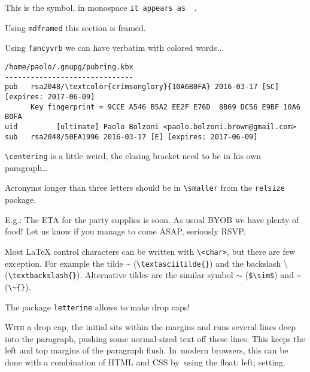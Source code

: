 \documentclass[a4paper]{article}
\newcommand\ifmonospace{\ifdim\fontdimen3\font=0pt }
\newcommand\Cpp{%
\ifmonospace%
    C++%
\else%
    C\kern-.1667em\raise.30ex\hbox{\smaller{++}}%
\fi%
\spacefactor1000 }
\begin{document}
This is the \Cpp{} symbol, in monospace \texttt{it appears as \Cpp{}}.

\vskip5mm
\begin{mdframed}[hidealllines=true,backgroundcolor=black!10]
Using \texttt{mdframed} this section is framed.

\blindtext
\end{mdframed}

\vskip5mm
Using \texttt{fancyvrb} we can have verbatim with colored words...
\begin{Verbatim}[commandchars=\\\{\}]
% gpg --fingerprint
/home/paolo/.gnupg/pubring.kbx
------------------------------
pub   rsa2048/\textcolor{crimsonglory}{10A6B0FA} 2016-03-17 [SC] [expires: 2017-06-09]
      Key fingerprint = 9CCE A546 B5A2 EE2F E76D  8B69 DC56 E9BF 10A6 B0FA
uid         [ultimate] Paolo Bolzoni <paolo.bolzoni.brown@gmail.com>
sub   rsa2048/50EA1996 2016-03-17 [E] [expires: 2017-06-09]
\end{Verbatim}

\vskip5mm
\texttt{\textbackslash{}centering} is a little weird, the closing bracket need to be
in his own paragraph\ldots

{\centering
\blindtext

}

\vskip5mm
Acronyms longer than three letters should be in \texttt{\textbackslash{}smaller} from the
\texttt{relsize} package.

E.g.: The ETA for the party supplies is soon. As usual {\smaller BYOB} we have
plenty of food!  Let us know if you manage to come {\smaller ASAP}, seriously
{\smaller RSVP}.

\vskip5mm
Most \LaTeX{} control characters can be written with
\texttt{\textbackslash{}<char>}, but there are few exception. For example the
tilde \textasciitilde{} (\texttt{\textbackslash{}textasciitilde\{\}}) and the
backslash \textbackslash{} (\texttt{\textbackslash{}textbackslash\{\}}).
Alternative tildes are the similar symbol $\sim$
(\texttt{\$\textbackslash{}sim\$}) and \~{}
(\texttt{\textbackslash{}\textasciitilde{}\{\}}).

\vskip5mm
The package \texttt{letterine} allows to make drop caps!

\lettrine[lines=3,slope=-4pt,nindent=-4pt,findent=2pt]{W}{ith} a drop cap, the initial sits
within the margins and runs several lines deep into the paragraph, pushing some
normal-sized text off these lines. This keeps the left and top margins of the
paragraph flush.  In~modern browsers, this can be done with a combination of
HTML and CSS by~using the float: left; setting.
\end{document}
